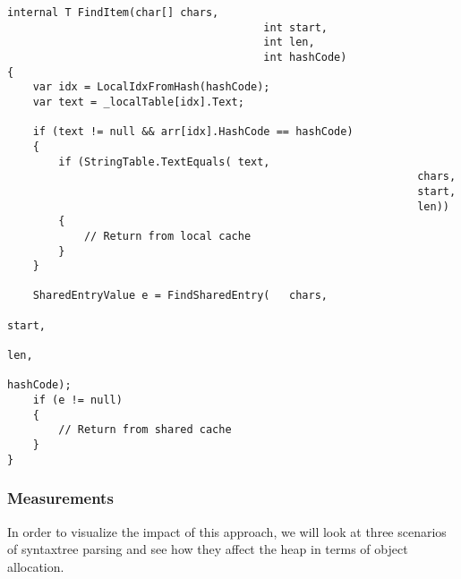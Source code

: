 \begin{lstlisting}
internal T FindItem(char[] chars, 
										int start, 
										int len, 
										int hashCode)
{
	var idx = LocalIdxFromHash(hashCode);
	var text = _localTable[idx].Text;

	if (text != null && arr[idx].HashCode == hashCode)
	{
		if (StringTable.TextEquals(	text, 
																chars, 
																start, 
																len))
		{
			// Return from local cache
		}
	}

	SharedEntryValue e = FindSharedEntry(	chars, 
																				start, 
																				len, 
																				hashCode);
	if (e != null)
	{
		// Return from shared cache
	}
}
\end{lstlisting}

\newpage
\subsubsection{Measurements}
\label{sec:re-use-measurements}

In order to visualize the impact of this approach, we will look at three scenarios of \gls{syntaxtree} parsing and see how they affect the heap in terms of object allocation.

